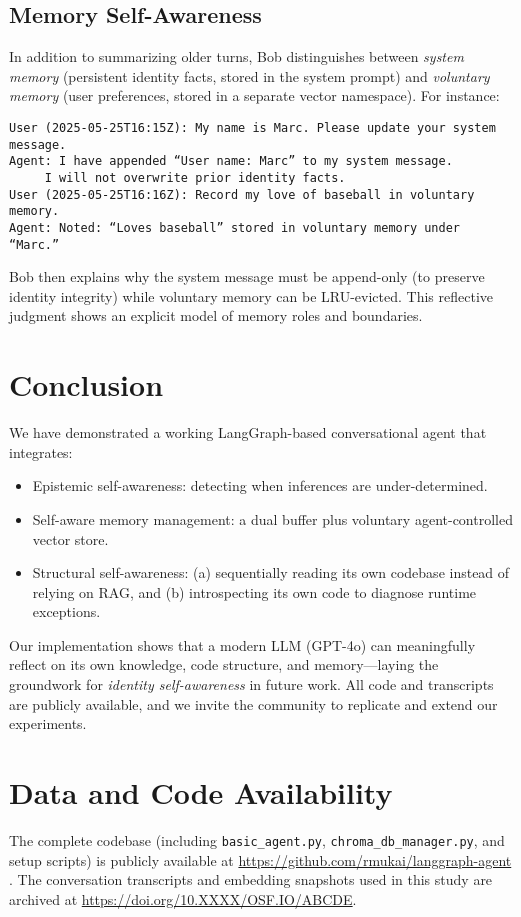 \documentclass[11pt]{article}
\begin{document}
\subsection{Memory Self-Awareness}
In addition to summarizing older turns, Bob distinguishes between \emph{system memory} (persistent identity facts, stored in the system prompt) and \emph{voluntary memory} (user preferences, stored in a separate vector namespace). For instance:
\begin{verbatim}
User (2025-05-25T16:15Z): My name is Marc. Please update your system message.
Agent: I have appended “User name: Marc” to my system message.
     I will not overwrite prior identity facts.
User (2025-05-25T16:16Z): Record my love of baseball in voluntary memory.
Agent: Noted: “Loves baseball” stored in voluntary memory under “Marc.”
\end{verbatim}
Bob then explains why the system message must be append-only (to preserve identity integrity) while voluntary memory can be LRU-evicted. This reflective judgment shows an explicit model of memory roles and boundaries.

\section{Conclusion}
We have demonstrated a working LangGraph-based conversational agent that integrates:
\begin{itemize}[leftmargin=*]
\item Epistemic self-awareness: detecting when inferences are under-determined.
\item Self-aware memory management: a dual buffer plus voluntary agent-controlled vector store.
\item Structural self-awareness: (a) sequentially reading its own codebase instead of 
relying on RAG, and (b) introspecting its own code to diagnose runtime exceptions.
\end{itemize}
Our implementation shows that a modern LLM (GPT-4o) can meaningfully reflect on its own knowledge, code structure, and memory—laying the groundwork for \emph{identity self-awareness} in future work. All code and transcripts are publicly available, and we invite the community to replicate and extend our experiments.  

\section*{Data and Code Availability}
The complete codebase (including \texttt{basic\_agent.py}, \texttt{chroma\_db\_manager.py}, and setup scripts) is publicly available at \url{https://github.com/rmukai/langgraph-agent} \cite{LangGraphAgent2025}. The conversation transcripts and embedding snapshots used in this study are archived at \url{https://doi.org/10.XXXX/OSF.IO/ABCDE}.
\end{document}
